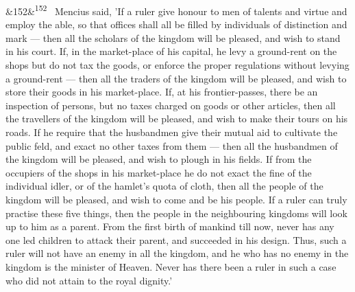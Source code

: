 \documentclass[12pt]{article}
\newcommand{\para}[1][]{\par\noindent\ifx&#1&\else\textsuperscript{\footnotesize #1}~\fi}
\begin{document}
\para[152] Mencius said, 'If a ruler give honour to men of talents and virtue and employ the able, so that offices shall all be filled by individuals of distinction and mark --- then all the scholars of the kingdom will be pleased, and wish to stand in his court. If, in the market-place of his capital, he levy a ground-rent on the shops but do not tax the goods, or enforce the proper regulations without levying a ground-rent --- then all the traders of the kingdom will be pleased, and wish to store their goods in his market-place. If, at his frontier-passes, there be an inspection of persons, but no taxes charged on goods or other articles, then all the travellers of the kingdom will be pleased, and wish to make their tours on his roads. If he require that the husbandmen give their mutual aid to cultivate the public feld, and exact no other taxes from them --- then all the husbandmen of the kingdom will be pleased, and wish to plough in his fields. If from the occupiers of the shops in his market-place he do not exact the fine of the individual idler, or of the hamlet's quota of cloth, then all the people of the kingdom will be pleased, and wish to come and be his people. If a ruler can truly practise these five things, then the people in the neighbouring kingdoms will look up to him as a parent. From the first birth of mankind till now, never has any one led children to attack their parent, and succeeded in his design. Thus, such a ruler will not have an enemy in all the kingdom, and he who has no enemy in the kingdom is the minister of Heaven. Never has there been a ruler in such a case who did not attain to the royal dignity.'
\end{document}
